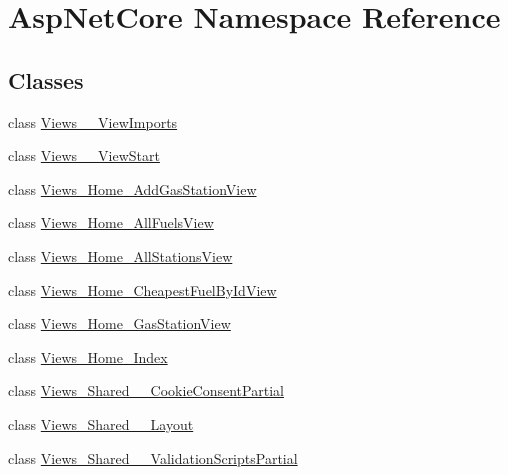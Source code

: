 \hypertarget{namespace_asp_net_core}{}\section{Asp\+Net\+Core Namespace Reference}
\label{namespace_asp_net_core}
\subsection*{Classes}
\begin{DoxyCompactItemize}
\item 
class \mbox{\hyperlink{class_asp_net_core_1_1_views_____view_imports}{Views\+\_\+\+\_\+\+View\+Imports}}
\item 
class \mbox{\hyperlink{class_asp_net_core_1_1_views_____view_start}{Views\+\_\+\+\_\+\+View\+Start}}
\item 
class \mbox{\hyperlink{class_asp_net_core_1_1_views___home___add_gas_station_view}{Views\+\_\+\+Home\+\_\+\+Add\+Gas\+Station\+View}}
\item 
class \mbox{\hyperlink{class_asp_net_core_1_1_views___home___all_fuels_view}{Views\+\_\+\+Home\+\_\+\+All\+Fuels\+View}}
\item 
class \mbox{\hyperlink{class_asp_net_core_1_1_views___home___all_stations_view}{Views\+\_\+\+Home\+\_\+\+All\+Stations\+View}}
\item 
class \mbox{\hyperlink{class_asp_net_core_1_1_views___home___cheapest_fuel_by_id_view}{Views\+\_\+\+Home\+\_\+\+Cheapest\+Fuel\+By\+Id\+View}}
\item 
class \mbox{\hyperlink{class_asp_net_core_1_1_views___home___gas_station_view}{Views\+\_\+\+Home\+\_\+\+Gas\+Station\+View}}
\item 
class \mbox{\hyperlink{class_asp_net_core_1_1_views___home___index}{Views\+\_\+\+Home\+\_\+\+Index}}
\item 
class \mbox{\hyperlink{class_asp_net_core_1_1_views___shared_____cookie_consent_partial}{Views\+\_\+\+Shared\+\_\+\+\_\+\+Cookie\+Consent\+Partial}}
\item 
class \mbox{\hyperlink{class_asp_net_core_1_1_views___shared_____layout}{Views\+\_\+\+Shared\+\_\+\+\_\+\+Layout}}
\item 
class \mbox{\hyperlink{class_asp_net_core_1_1_views___shared_____validation_scripts_partial}{Views\+\_\+\+Shared\+\_\+\+\_\+\+Validation\+Scripts\+Partial}}
\end{DoxyCompactItemize}
